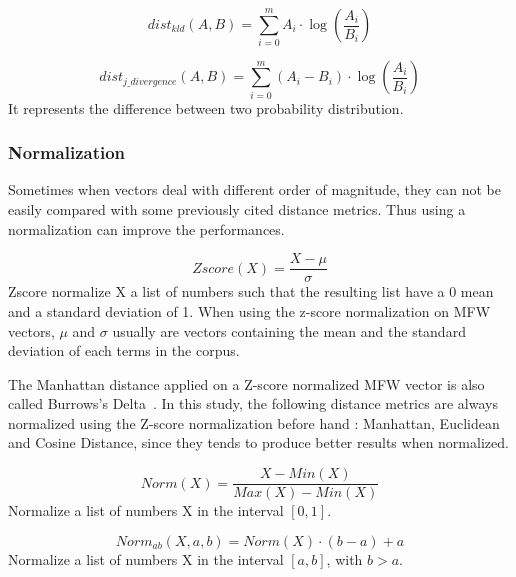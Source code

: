 \begin{definition}
  \begin{equation}
    dist_{kld}(A, B) = \sum_{i=0}^{m} A_i \cdot \log(\frac{A_i}{B_i})
  \end{equation}
\end{definition}

\begin{definition}
  \begin{equation}
    dist_{j\_divergence}(A, B) = \sum_{i=0}^{m} (A_i - B_i) \cdot \log(\frac{A_i}{B_i})
  \end{equation}
  It represents the difference between two probability distribution.
\end{definition}


\subsubsection{Normalization}

Sometimes when vectors deal with different order of magnitude, they can not be easily compared with some previously cited distance metrics.
Thus using a normalization can improve the performances.

\begin{definition}
  \label{def:z_score}
  \begin{equation}
    Zscore(X) = \frac{X - \mu}{\sigma}
  \end{equation}
  Zscore normalize X a list of numbers such that the resulting list have a 0 mean and a standard deviation of 1.
  When using the z-score normalization on MFW vectors, $\mu$ and $\sigma$ usually are vectors containing the mean and the standard deviation of each terms in the corpus.
\end{definition}

The Manhattan distance applied on a Z-score normalized MFW vector is also called Burrows's Delta~\cite{savoy_stylo}.
In this study, the following distance metrics are always normalized using the Z-score normalization before hand : Manhattan, Euclidean and Cosine Distance, since they tends to produce better results when normalized.

\begin{definition}
  \label{def:normalization}
  \begin{equation}
    Norm(X) = \frac{X - Min(X)}{Max(X) - Min(X)}
  \end{equation}
  Normalize a list of numbers X in the interval $[0, 1]$.

  \begin{equation}
    Norm_{ab}(X, a, b) = Norm(X) \cdot (b - a) + a
  \end{equation}
  Normalize a list of numbers X in the interval $[a, b]$, with $b > a$.
\end{definition}

